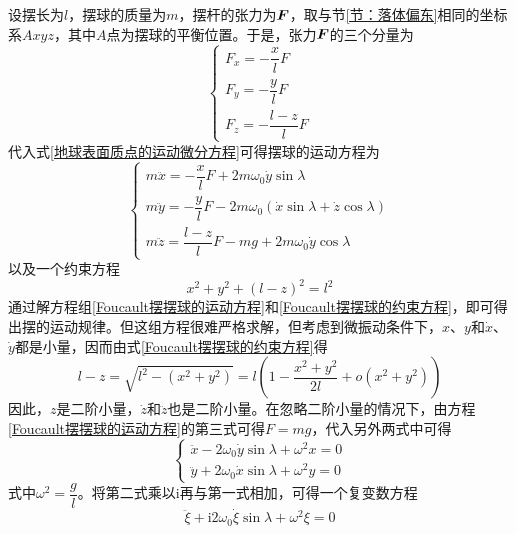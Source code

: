 设摆长为$l$，摆球的质量为$m$，摆杆的张力为$\boldsymbol{F}$，取与节\ref{节：落体偏东}相同的坐标系$Axyz$，其中$A$点为摆球的平衡位置。于是，张力$\boldsymbol{F}$的三个分量为
\begin{equation*}
\begin{cases}
	F_x = -\dfrac{x}{l} F \\[1.5ex]
	F_y = -\dfrac{y}{l} F \\[1.5ex]
	F_z = -\dfrac{l-z}{l} F
\end{cases}
\end{equation*}
代入式\eqref{地球表面质点的运动微分方程}可得摆球的运动方程为
\begin{equation}
\begin{cases}
	m\ddot{x} = -\dfrac{x}{l} F+2m\omega_0 \dot{y}\sin \lambda \\[1.5ex]
	m\ddot{y} = -\dfrac{y}{l} F-2m\omega_0(\dot{x}\sin \lambda+ \dot{z}\cos \lambda) \\[1.5ex]
	m\ddot{z} = \dfrac{l-z}{l}F-mg+2m\omega_0\dot{y}\cos \lambda
\end{cases}
\label{Foucault摆摆球的运动方程}
\end{equation}
以及一个约束方程
\begin{equation}
	x^2+y^2+(l-z)^2 = l^2
	\label{Foucault摆摆球的约束方程}
\end{equation}
通过解方程组\eqref{Foucault摆摆球的运动方程}和\eqref{Foucault摆摆球的约束方程}，即可得出摆的运动规律。但这组方程很难严格求解，但考虑到微振动条件下，$x$、$y$和$\dot{x}$、$\dot{y}$都是小量，因而由式\eqref{Foucault摆摆球的约束方程}得
\begin{equation*}
	l-z = \sqrt{l^2-(x^2+y^2)} = l\left(1-\frac{x^2+y^2}{2l} + o(x^2+y^2)\right)
\end{equation*}
因此，$z$是二阶小量，$\dot{z}$和$\ddot{z}$也是二阶小量。在忽略二阶小量的情况下，由方程\eqref{Foucault摆摆球的运动方程}的第三式可得$F=mg$，代入另外两式中可得
\begin{equation*}
\begin{cases}
	\ddot{x} - 2\omega_0 \dot{y}\sin \lambda + \omega^2 x = 0 \\
	\ddot{y} + 2\omega_0 \dot{x}\sin \lambda + \omega^2 y = 0
\end{cases}
\end{equation*}
式中$\omega^2 =\dfrac{g}{l}$。将第二式乘以$\mathrm{i}$再与第一式相加，可得一个复变数方程
\begin{equation}
	\ddot{\xi} + \mathrm{i} 2\omega_0 \dot{\xi} \sin \lambda + \omega^2 \xi = 0
	\label{Foucault摆复变数微分方程}
\end{equation}
